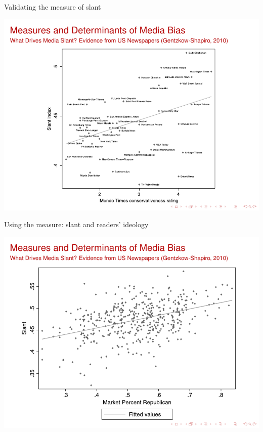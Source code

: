 \documentclass[english]{beamer}
\begin{document}
\begin{frame}{Validating the measure of slant}
\vspace{-7pt}
\begin{center}
\includegraphics[scale=1]{Images/gentzkow_table3.pdf}
\end{center}
\end{frame}

\begin{frame}{Using the measure: slant and readers' ideology}
\vspace{-7pt}
\begin{center}
\includegraphics[scale=1]{Images/gentzkow_table4.pdf}
\end{center}
\end{frame}
\end{document}
